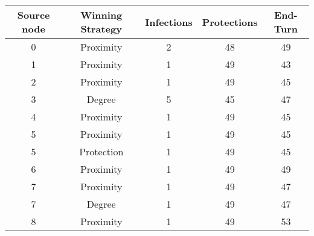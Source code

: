 \documentclass[results.tex]{subfiles}
\begin{document}
    \begin{center}
        \begin{tabular}{| c || c | c | c | c |}
            \hline
            {\bfseries Source node} & {\bfseries Winning Strategy} & {\bfseries Infections} & {\bfseries Protections}
            & {\bfseries End-Turn}
            \\  %
            \hline\hline
            0                       & Proximity                    & 2                      & 48                      & 49                   \\
            \hline
            1                       & Proximity                    & 1                      & 49                      & 43                   \\
            \hline
            2                       & Proximity                    & 1                      & 49                      & 45                   \\
            \hline
            3                       & Degree                       & 5                      & 45                      & 47                   \\
            \hline
            4                       & Proximity                    & 1                      & 49                      & 45                   \\
            \hline
            5                       & Proximity                    & 1                      & 49                      & 45                   \\
            \hline
            5                       & Protection                   & 1                      & 49                      & 45                   \\
            \hline
            6                       & Proximity                    & 1                      & 49                      & 49                   \\
            \hline
            7                       & Proximity                    & 1                      & 49                      & 47                   \\
            \hline
            7                       & Degree                       & 1                      & 49                      & 47                   \\
            \hline
            8                       & Proximity                    & 1                      & 49                      & 53                   \\

\end{tabular}
\end{center}
\end{document}
